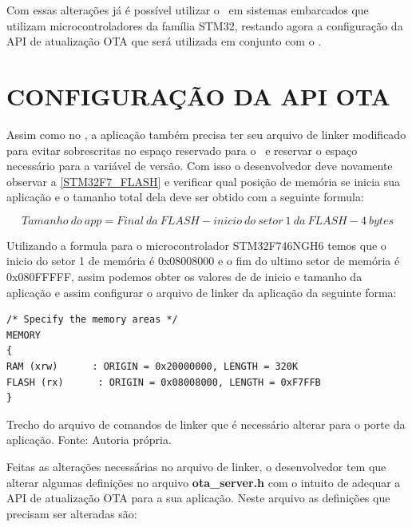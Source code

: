 Com essas alterações já é possível utilizar o \bootloader\ em sistemas embarcados que utilizam microcontroladores da família STM32, restando agora a configuração da API de atualização OTA que será utilizada em conjunto com o \bootloader.

\section{CONFIGURAÇÃO DA API OTA}
Assim como no \bootloader, a aplicação também precisa ter seu arquivo de linker modificado para evitar sobrescritas no espaço reservado para o \bootloader\ e reservar o espaço necessário para a variável de versão. Com isso o desenvolvedor deve novamente observar a \autoref{STM32F7_FLASH} e verificar qual posição de memória se inicia sua aplicação e o tamanho total dela deve ser obtido com a seguinte formula:

\begin{equation}
    Tamanho\ do\ app = Final\ da\ FLASH - inicio\ do\ setor\ 1\ da\ FLASH - 4\ bytes 
    \label{eq:calculo_flash}
\end{equation}


Utilizando a formula para o microcontrolador STM32F746NGH6 temos que o inicio do setor 1 de memória é 0x08008000 e o fim do ultimo setor de memória é 0x080FFFFF, assim podemos obter os valores de de inicio e tamanho da aplicação e assim configurar o arquivo de linker da aplicação da seguinte forma:


\begin{algorithm}[H]
\begin{lstlisting}
/* Specify the memory areas */
MEMORY
{
RAM (xrw)      : ORIGIN = 0x20000000, LENGTH = 320K
FLASH (rx)      : ORIGIN = 0x08008000, LENGTH = 0xF7FFB
}
\end{lstlisting}
\caption{Trecho do arquivo de comandos de linker que é necessário alterar para o porte da aplicação.
\newline Fonte: Autoria própria.}
\end{algorithm}

Feitas as alterações necessárias no arquivo de linker, o desenvolvedor tem que alterar algumas definições no arquivo \textbf{ota\_server.h} com o intuito de adequar a API de atualização OTA para a sua aplicação. Neste arquivo as definições que precisam ser alteradas são:

